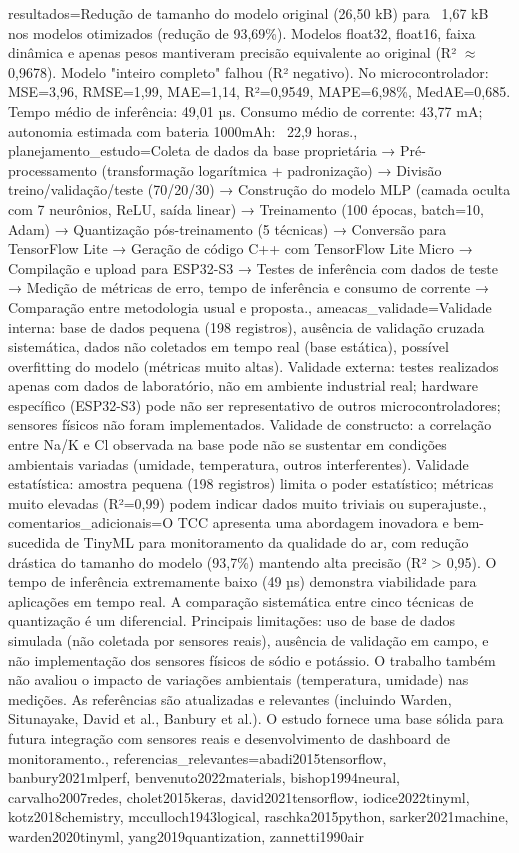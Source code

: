 \documentclass[12pt,a4paper]{article}
\begin{document}
{  resultados={Redução de tamanho do modelo original (26,50 kB) para ~1,67 kB nos modelos otimizados (redução de 93,69\%). Modelos float32, float16, faixa dinâmica e apenas pesos mantiveram precisão equivalente ao original (R² $\approx$ 0,9678). Modelo "inteiro completo" falhou (R² negativo). No microcontrolador: MSE=3,96, RMSE=1,99, MAE=1,14, R²=0,9549, MAPE=6,98\%, MedAE=0,685. Tempo médio de inferência: 49,01 µs. Consumo médio de corrente: 43,77 mA; autonomia estimada com bateria 1000mAh: ~22,9 horas.},
  planejamento_estudo={Coleta de dados da base proprietária → Pré-processamento (transformação logarítmica + padronização) → Divisão treino/validação/teste (70/20/30) → Construção do modelo MLP (camada oculta com 7 neurônios, ReLU, saída linear) → Treinamento (100 épocas, batch=10, Adam) → Quantização pós-treinamento (5 técnicas) → Conversão para TensorFlow Lite → Geração de código C++ com TensorFlow Lite Micro → Compilação e upload para ESP32-S3 → Testes de inferência com dados de teste → Medição de métricas de erro, tempo de inferência e consumo de corrente → Comparação entre metodologia usual e proposta.},
  ameacas_validade={Validade interna: base de dados pequena (198 registros), ausência de validação cruzada sistemática, dados não coletados em tempo real (base estática), possível overfitting do modelo (métricas muito altas). Validade externa: testes realizados apenas com dados de laboratório, não em ambiente industrial real; hardware específico (ESP32-S3) pode não ser representativo de outros microcontroladores; sensores físicos não foram implementados. Validade de constructo: a correlação entre Na/K e Cl observada na base pode não se sustentar em condições ambientais variadas (umidade, temperatura, outros interferentes). Validade estatística: amostra pequena (198 registros) limita o poder estatístico; métricas muito elevadas (R²=0,99) podem indicar dados muito triviais ou superajuste.},
  comentarios_adicionais={O TCC apresenta uma abordagem inovadora e bem-sucedida de TinyML para monitoramento da qualidade do ar, com redução drástica do tamanho do modelo (93,7\%) mantendo alta precisão (R² > 0,95). O tempo de inferência extremamente baixo (49 µs) demonstra viabilidade para aplicações em tempo real. A comparação sistemática entre cinco técnicas de quantização é um diferencial. Principais limitações: uso de base de dados simulada (não coletada por sensores reais), ausência de validação em campo, e não implementação dos sensores físicos de sódio e potássio. O trabalho também não avaliou o impacto de variações ambientais (temperatura, umidade) nas medições. As referências são atualizadas e relevantes (incluindo Warden, Situnayake, David et al., Banbury et al.). O estudo fornece uma base sólida para futura integração com sensores reais e desenvolvimento de dashboard de monitoramento.},
  referencias_relevantes={abadi2015tensorflow, banbury2021mlperf, benvenuto2022materials, bishop1994neural, carvalho2007redes, cholet2015keras, david2021tensorflow, iodice2022tinyml, kotz2018chemistry, mcculloch1943logical, raschka2015python, sarker2021machine, warden2020tinyml, yang2019quantization, zannetti1990air}
}
\end{document}
